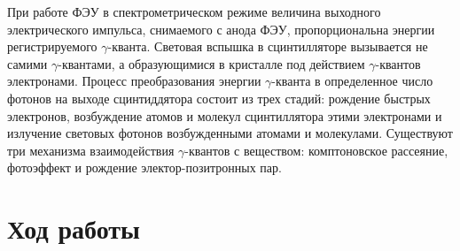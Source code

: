 \documentclass[a4paper,12pt]{article}
\begin{document}
При работе ФЭУ в спектрометрическом режиме величина выходного электрического импульса, снимаемого с анода ФЭУ, пропорциональна энергии регистрируемого $\gamma$-кванта. Световая вспышка в сцинтилляторе вызывается не самими $\gamma$-квантами, а образующимися в кристалле под действием $\gamma$-квантов электронами. Процесс преобразования энергии $\gamma$-кванта в определенное число фотонов на выходе сцинтиддятора состоит из трех стадий: рождение быстрых электронов, возбуждение атомов и молекул сцинтиллятора этими электронами и излучение световых фотонов возбужденными атомами и молекулами. Существуют три механизма взаимодействия $\gamma$-квантов с веществом: комптоновское рассеяние, фотоэффект и рождение электор-позитронных пар.

\section{Ход работы}
\end{document}
